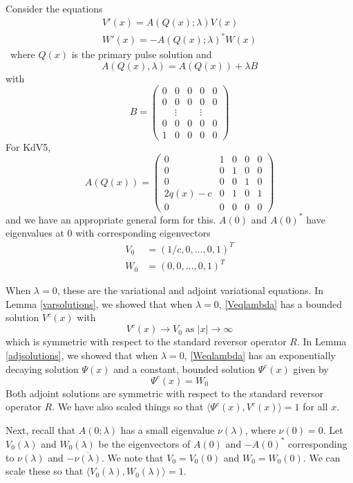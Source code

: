 \documentclass[thesis.tex]{subfiles}
\begin{document}
Consider the equations
\begin{align}
V'(x) = A(Q(x); \lambda) V(x) \label{Veqlambda} \\
W'(x) = -A(Q(x); \lambda)^* W(x) \label{Weqlambda}
\end{align}\
where $Q(x)$ is the primary pulse solution and 
\[
A(Q(x), \lambda) = A(Q(x)) + \lambda B
\]
with 
\begin{equation*}
B = \begin{pmatrix}0 & 0 & 0 & 0 & 0 \\0 & 0 & 0 & 0 & 0 \\  & 
\vdots & & \vdots & \\0 & 0 & 0 & 0 & 0 \\1 & 0 & 0 & 0 & 0 \end{pmatrix} 
\end{equation*}
For KdV5, 
\begin{equation*}
A(Q(x)) = \begin{pmatrix}0 & 1 & 0 & 0 & 0 \\ 0 & 0 & 1 & 0 & 0 \\ 0 & 0 & 0 & 1 & 0 \\ 2 q(x) - c & 0 & 1 & 0 & 1 \\
0 & 0 & 0 & 0 & 0 
\end{pmatrix}
\end{equation*}
and we have an appropriate general form for this. $A(0)$ and $A(0)^*$ have eigenvalues at 0 with corresponding eigenvectors
\begin{align*}
V_0 &= (1/c, 0, \dots, 0, 1)^T \\
W_0 &= (0, 0, \dots, 0, 1)^T
\end{align*}

When $\lambda = 0$, these are the variational and adjoint variational equations. In Lemma \ref{varsolutions}, we showed that when $\lambda = 0$, \eqref{Veqlambda} has a bounded solution $V^c(x)$ with
\[
V^c(x) \rightarrow V_0 \text{ as }|x| \rightarrow \infty
\]
which is symmetric with respect to the standard reversor operator $R$. In Lemma \ref{adjsolutions}, we showed that when $\lambda = 0$, \eqref{Weqlambda} has an exponentially decaying solution $\Psi(x)$ and a constant, bounded solution $\Psi^c(x)$ given by 
\[
\Psi^c(x) = W_0 
\]
Both adjoint solutions are symmetric with respect to the standard reversor operator $R$. We have also scaled things so that $\langle \Psi^c(x), V^c(x) \rangle = 1$ for all $x$.

Next, recall that $A(0; \lambda)$ has a small eigenvalue $\nu(\lambda)$, where $\nu(0) = 0$. Let $V_0(\lambda)$ and $W_0(\lambda)$ be the eigenvectors of $A(0)$ and $-A(0)^*$ corresponding to $\nu(\lambda)$ and $-\overline{ \nu(\lambda)}$. We note that $V_0 = V_0(0)$ and $W_0 = W_0(0)$. We can scale these so that $\langle V_0(\lambda), W_0(\lambda) \rangle = 1$.
\end{document}
